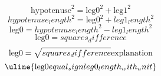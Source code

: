 \[\text{{{hypotenuse}}}^{{2}}=\text{{{leg0}}}^{{2}}+\text{{{leg1}}}^{{2}}\]
\[{hypotenuse_length}^{{2}}=\text{{{leg0}}}^{{2}}+{leg1_length}^{{2}}\]
\[\text{{{leg0}}}={hypotenuse_length}^{{2}}-{leg1_length}^{{2}}\]
\[\text{{{leg0}}}={squares_difference}\]
\[\text{{{leg0}}}=\sqrt{{\mathstrut {squares_difference}}}\text{{{explanation}}}\]
\[\uline{{\text{{{leg0}}}{equal_sign}{leg0_length_with_unit}}}\]